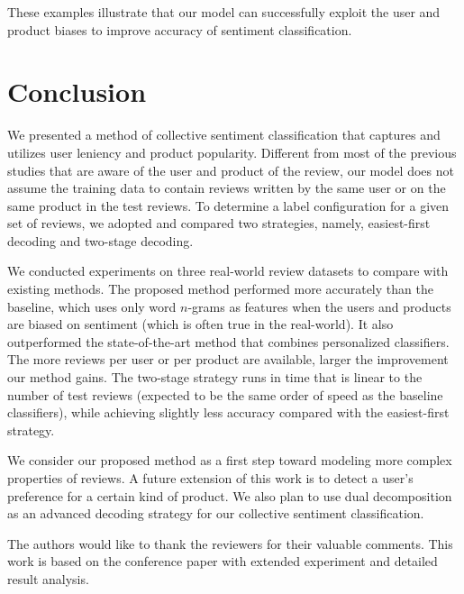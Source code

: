 \documentclass[english]{jnlp_1.4}
\begin{document}
These examples illustrate that our model can successfully exploit the user and product biases to improve accuracy of sentiment classification.


\section{Conclusion}
\label{sec:con}

We presented a method of collective sentiment classification that captures and utilizes  user leniency and
 product popularity. 
Different from most of the previous studies that are aware of the user and product of the review, our model does not assume the training data to contain reviews written by the same user or on the same product in the test reviews. 
To determine a label configuration for a given set of reviews,  we adopted and compared two strategies, namely, easiest-first decoding and two-stage decoding. 

We conducted experiments on three real-world review datasets  to compare with existing methods. 
The proposed method  performed more accurately than the baseline, which uses only word $n$-grams as features when the users and products are biased on sentiment (which is often true in the real-world). 
It also outperformed the state-of-the-art method that combines personalized classifiers. 
The more reviews per user or per product are available, larger the improvement our method gains.
The two-stage strategy runs in time that is linear to the number of test reviews (expected to be the same order of speed as the baseline classifiers), while achieving slightly less accuracy compared with the easiest-first strategy. 


We consider our proposed method as a first step toward modeling more complex properties of reviews.
A future extension of this work is to detect a user's preference for a certain kind of product. 
We also plan to use dual decomposition \cite{Koo:2010} as an advanced decoding strategy for our collective sentiment classification. 


\acknowledgment

The authors would like to thank the reviewers for their valuable comments.
This work is based on the conference paper \cite{Gao:paclic2013} with extended experiment and detailed result analysis.
\end{document}
